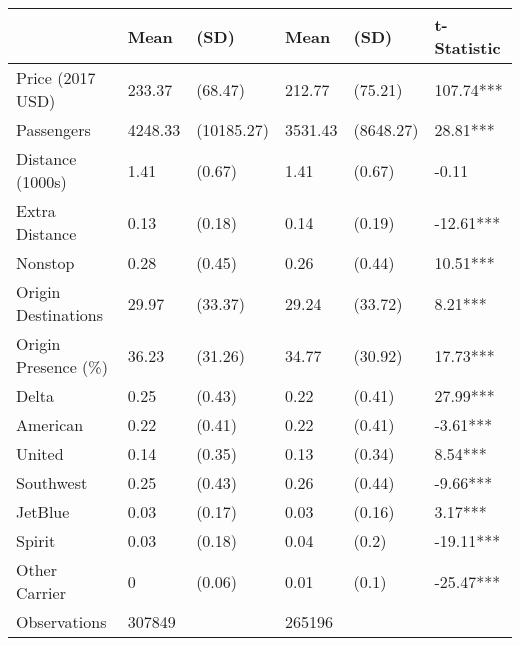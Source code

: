 
\begin{tabular}[t]{llllll}
\toprule
 & Mean & (SD) & Mean & (SD) & t-Statistic\\
\midrule
Price (2017 USD) & 233.37 & (68.47) & 212.77 & (75.21) & 107.74***\\
Passengers & 4248.33 & (10185.27) & 3531.43 & (8648.27) & 28.81***\\
Distance (1000s) & 1.41 & (0.67) & 1.41 & (0.67) & -0.11\\
Extra Distance & 0.13 & (0.18) & 0.14 & (0.19) & -12.61***\\
Nonstop & 0.28 & (0.45) & 0.26 & (0.44) & 10.51***\\
\addlinespace
Origin Destinations & 29.97 & (33.37) & 29.24 & (33.72) & 8.21***\\
Origin Presence (\%) & 36.23 & (31.26) & 34.77 & (30.92) & 17.73***\\
Delta & 0.25 & (0.43) & 0.22 & (0.41) & 27.99***\\
American & 0.22 & (0.41) & 0.22 & (0.41) & -3.61***\\
United & 0.14 & (0.35) & 0.13 & (0.34) & 8.54***\\
\addlinespace
Southwest & 0.25 & (0.43) & 0.26 & (0.44) & -9.66***\\
JetBlue & 0.03 & (0.17) & 0.03 & (0.16) & 3.17***\\
Spirit & 0.03 & (0.18) & 0.04 & (0.2) & -19.11***\\
Other Carrier & 0 & (0.06) & 0.01 & (0.1) & -25.47***\\
Observations & 307849 &  & 265196 &  & \\
\bottomrule
\end{tabular}
